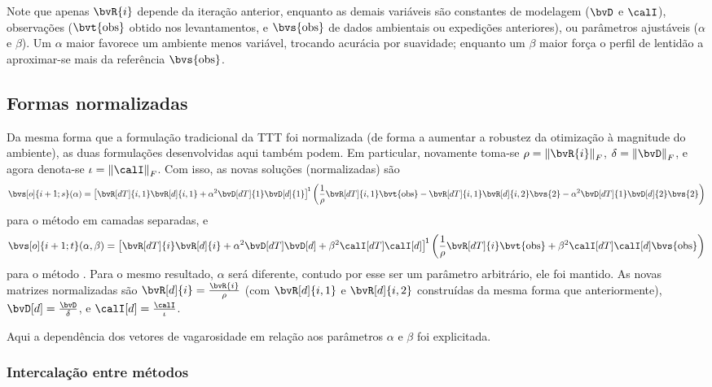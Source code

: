 Note que apenas $\bvR{i}$ depende da iteração anterior, enquanto as demais variáveis são constantes de modelagem ($\bvD$ e $\calI$), observações ($\bvt{\obs}$ obtido nos levantamentos, e $\bvs{\obs}$ de dados ambientais ou expedições anteriores), ou parâmetros ajustáveis ($\alpha$ e $\beta$). Um $\alpha$ maior favorece um ambiente menos variável, trocando acurácia por suavidade; enquanto um $\beta$ maior força o perfil de lentidão a aproximar-se mais da referência $\bvs{\obs}$.

\subsection{Formas normalizadas}
\label{subsec:sec4:formas_normalizadas}

Da mesma forma que a formulação tradicional da TTT foi normalizada (de forma a aumentar a robustez da otimização à magnitude do ambiente), as duas formulações desenvolvidas aqui também podem. Em particular, novamente toma-se $\rho = \norm{\bvR{i}}_F$, $\delta = \norm{\bvD}_F$, e agora denota-se $\iota = \norm{\calI}_F$. Com isso, as novas soluções (normalizadas) são
\begin{equation}
	\bvs[o]{i+1;s}(\alpha) = \inv*{\bvR[dT]{i,1} \bvR[d]{i,1} + \alpha^2 \bvD[dT]{1} \bvD[d]{1}} \pts{\frac{1}{\rho} \bvR[dT]{i,1} \bvt{\obs} - \bvR[dT]{i,1} \bvR[d]{i,2} \bvs{2} - \alpha^2 \bvD[dT]{1} \bvD[d]{2} \bvs{2}}
	\label{eq:sec4:solucao_separado_normalizado}
\end{equation}
para o método em camadas separadas, e
\begin{equation}
	\bvs[o]{i+1;t}(\alpha,\beta) = \inv*{\bvR[dT]{i} \bvR[d]{i} + \alpha^2 \bvD[dT]\bvD[d] + \beta^2 \calI[dT] \calI[d] } \pts{\frac{1}{\rho} \bvR[dT]{i} \bvt{\obs} + \beta^2 \calI[dT] \calI[d] \bvs{\obs}}
	\label{eq:sec4:solucao_tradeoff_normalizado}
\end{equation}
para o método . Para o mesmo resultado, $\alpha$ será diferente, contudo por esse ser um parâmetro arbitrário, ele foi mantido. As novas matrizes normalizadas são $\bvR[d]{i} = \frac{\bvR{i}}{\rho}$ (com $\bvR[d]{i,1}$ e $\bvR[d]{i,2}$ construídas da mesma forma que anteriormente), $\bvD[d] = \frac{\bvD}{\delta}$, e $\calI[d] = \frac{\calI}{\iota}$.

Aqui a dependência dos vetores de vagarosidade em relação aos parâmetros $\alpha$ e $\beta$ foi explicitada.

\subsubsection*{Intercalação entre métodos}

